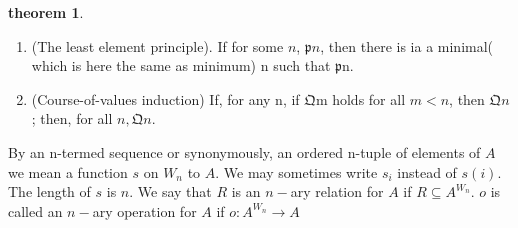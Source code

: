 \documentclass[a4paper,11pt]{article}%
\theoremstyle{remark}
\theoremstyle{definition}
\newtheorem{theorem}{theorem}[section]
\theoremstyle{definition}
\theoremstyle{plain}
\theoremstyle{definition}
\begin{document}
\begin{theorem}
    \begin{enumerate}
        \item (The least element principle). If for some $n$, $\mathfrak{p}n$, then there is 
        ia a minimal( which is here the same as minimum) n such that $\mathfrak{p}$n.
        \item (Course-of-values induction) If, for any n, if $\mathfrak{Q}$m holds for all $m<n$,
        then $\mathfrak{Q}n$; then, for all $n,\mathfrak{Q}n$. 
    \end{enumerate}
\end{theorem}
  By an n-termed sequence or synonymously, an ordered n-tuple of elements of $A$
  we mean a function $s$ on $W_n$ to $A$. We may sometimes write $s_i$ instead of $s(i)$.
  The length of $s$ is $n$. We say that $R$ is an $n-$ary relation for $A$ if $R\subseteq A^{W_n}$.
  $o$ is called an $n-$ary operation for $A$ if $o:A^{W_n}\rightarrow A$
\end{document}
